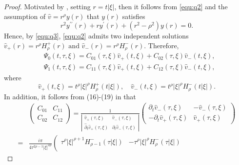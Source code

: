 \documentclass[11pt,twoside]{article}
\theoremstyle{plain}
\theoremstyle{definition}
\theoremstyle{remark}
\numberwithin{equation}{section}
\begin{document}
\begin{proof}
Motivated by \cite[Corollary 2.2]{Wirth-3}, setting $r=t|\xi|$,
then it follows from \eqref{equ:q2} and the assumption of $\hat{v}=r^{\rho} y(r)$ that $y(r)$ satisfies
\begin{equation}\label{equ:q3}
r^{2} y^{\prime \prime}(r)+r y^{\prime}(r)+\left(r^{2}-\rho^{2}\right) y(r)=0.
\end{equation}
Hence, by \eqref{equ:q3}, \eqref{equ:q2} admits two independent solutions
$\text {$\hat{v}_{+}(r)=r^{\rho} H_{\rho}^{+}(r)$ and $\hat{v}_{-}(r)=r^{\rho} H_{\rho}^{-}(r)$}$.
Therefore,
\begin{equation}\label{l-5}
\begin{aligned}
& \Psi_{0}(t, \tau, \xi)=C_{01}(\tau, \xi) \hat{v}_{+}(t, \xi)+C_{02}(\tau, \xi) \hat{v}_{-}(t, \xi), \\
& \Psi_{1}(t, \tau, \xi)=C_{11}(\tau, \xi) \hat{v}_{+}(t, \xi)+C_{12}(\tau, \xi) \hat{v}_{-}(t, \xi),
\end{aligned}
\end{equation}
where
\begin{equation}\label{l-6}
\hat{v}_{+}(t, \xi)=t^{\rho}|\xi|^{\rho} H_{\rho}^{+}(t|\xi|), \quad \hat{v}_{-}(t, \xi)=t^{\rho}|\xi|^{\rho} H_{\rho}^{-}(t|\xi|).
\end{equation}
In addition, it follows from (16)-(19) in \cite{Wirth-3} that
\begin{equation}\label{l-7}
\begin{aligned}
& \left(\begin{array}{cc}
C_{01} & C_{11} \\
C_{02} & C_{12}
\end{array}\right)=\frac{1}{\left|\begin{array}{cc}
\hat{v}_{+}(\tau, \xi) & \hat{v}_{-}(\tau, \xi) \\
\hat{\partial}_{t} \hat{v}_{+}(\tau, \xi) & \partial_{t} \hat{v}_{-}(\tau, \xi)
\end{array}\right|}\left(\begin{array}{cc}
\partial_{t} \hat{v}_{-}(\tau, \xi) & -\hat{v}_{-}(\tau, \xi) \\
-\partial_{t} \hat{v}_{+}(\tau, \xi) & \hat{v}_{+}(\tau, \xi)
\end{array}\right) \\
= & \frac{i \pi}{4 \tau^{2 \rho-1}|\xi|^{2 \rho}}\left(\begin{array}{cc}
\tau^{\rho}|\xi|^{\rho+1} H_{\rho-1}^{-}(\tau|\xi|) & -\tau^{\rho}|\xi|^{\rho} H_{\rho}^{-}(\tau|\xi|) \\

\end{array}
\end{aligned}
\end{equation}
\end{proof}
\end{document}
